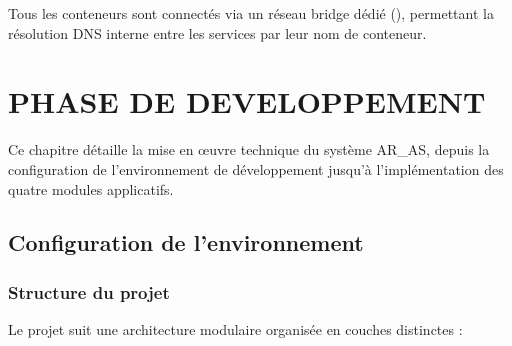 Tous les conteneurs sont connectés via un réseau bridge dédié (), permettant la résolution DNS interne entre les services par leur nom de conteneur.



\chapter{PHASE DE DEVELOPPEMENT}

Ce chapitre détaille la mise en œuvre technique du système AR\_AS, depuis la configuration de l'environnement de développement jusqu'à l'implémentation des quatre modules applicatifs.

\section{Configuration de l'environnement}

\subsection{Structure du projet}

Le projet suit une architecture modulaire organisée en couches distinctes :

